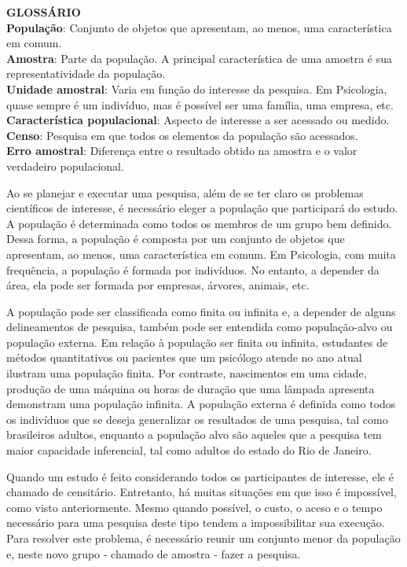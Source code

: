\documentclass[
]{book}
\begin{document}
\begin{glossario}
\textbf{GLOSSÁRIO}\\
\textbf{População}: Conjunto de objetos que apresentam, ao menos, uma
característica em comum.\\
\textbf{Amostra}: Parte da população. A principal característica de uma
amostra é sua representatividade da população.\\
\textbf{Unidade amostral}: Varia em função do interesse da pesquisa. Em
Psicologia, quase sempre é um indivíduo, mas é possível ser uma família,
uma empresa, etc.\\
\textbf{Característica populacional}: Aspecto de interesse a ser
acessado ou medido.\\
\textbf{Censo}: Pesquisa em que todos os elementos da população são
acessados.\\
\textbf{Erro amostral}: Diferença entre o resultado obtido na amostra e
o valor verdadeiro populacional.
\end{glossario}

Ao se planejar e executar uma pesquisa, além de se ter claro os problemas científicos de interesse, é necessário eleger a população que participará do estudo. A população é determinada como todos os membros de um grupo bem definido. Dessa forma, a população é composta por um conjunto de objetos que apresentam, ao menos, uma característica em comum. Em Psicologia, com muita frequência, a população é formada por indivíduos. No entanto, a depender da área, ela pode ser formada por empresas, árvores, animais, etc.

A população pode ser classificada como finita ou infinita e, a depender de alguns delineamentos de pesquisa, também pode ser entendida como população-alvo ou população externa. Em relação à população ser finita ou infinita, estudantes de métodos quantitativos ou pacientes que um psicólogo atende no ano atual ilustram uma população finita. Por contraste, nascimentos em uma cidade, produção de uma máquina ou horas de duração que uma lâmpada apresenta demonstram uma população infinita. A população externa é definida como todos os indivíduos que se deseja generalizar os resultados de uma pesquisa, tal como brasileiros adultos, enquanto a população alvo são aqueles que a pesquisa tem maior capacidade inferencial, tal como adultos do estado do Rio de Janeiro.

Quando um estudo é feito considerando todos os participantes de interesse, ele é chamado de censitário. Entretanto, há muitas situações em que isso é impossível, como visto anteriormente. Mesmo quando possível, o custo, o aceso e o tempo necessário para uma pesquisa deste tipo tendem a impossibilitar sua execução. Para resolver este problema, é necessário reunir um conjunto menor da população e, neste novo grupo - chamado de amostra - fazer a pesquisa.
\end{document}

